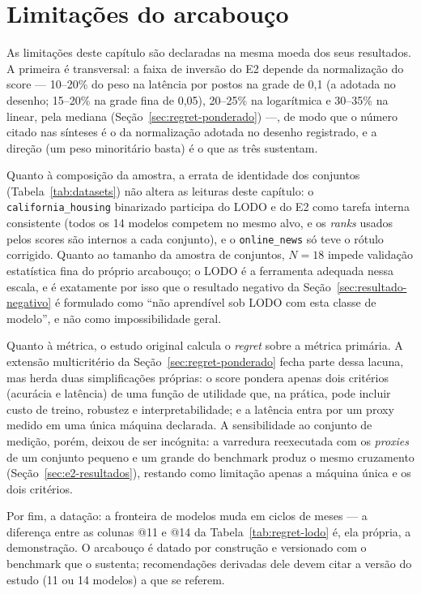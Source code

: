 \section{Limitações do arcabouço}
\label{sec:limitacoes-framework}

As limitações deste capítulo são declaradas na mesma moeda dos seus
resultados. A primeira é transversal: a faixa de inversão do E2
depende da normalização do score --- 10--20\% do peso na latência
por postos na grade de 0,1 (a adotada no desenho; 15--20\% na grade
fina de 0,05), 20--25\% na logarítmica e
30--35\% na linear, pela mediana
(Seção~\ref{sec:regret-ponderado}) ---, de modo que o número citado
nas sínteses é o da normalização adotada no desenho registrado, e a
direção (um
peso minoritário basta) é o que as três sustentam.

Quanto à composição da amostra, a errata de identidade dos conjuntos
(Tabela~\ref{tab:datasets}) não altera as leituras deste capítulo: o
\texttt{california\_\allowbreak housing} binarizado participa do LODO e do E2 como
tarefa interna consistente (todos os 14 modelos competem no mesmo alvo,
e os \emph{ranks} usados pelos scores são internos a cada conjunto), e
o \texttt{online\_news} só teve o rótulo corrigido. Quanto ao tamanho
da amostra de conjuntos, $N{=}18$ impede validação
estatística fina do próprio arcabouço; o LODO é a ferramenta adequada
nessa escala, e é exatamente por isso que o resultado negativo
da Seção~\ref{sec:resultado-negativo} é formulado como ``não aprendível
sob LODO com esta classe de modelo'', e não como impossibilidade geral.

Quanto à métrica, o estudo original calcula o \emph{regret} sobre a
métrica primária. A extensão multicritério da
Seção~\ref{sec:regret-ponderado} fecha parte dessa lacuna, mas herda
duas simplificações próprias: o score pondera apenas dois critérios
(acurácia e latência) de uma função de utilidade que, na prática, pode
incluir custo de treino, robustez e interpretabilidade; e a latência
entra por um proxy medido em uma única máquina declarada. A sensibilidade
ao conjunto de medição, porém, deixou de ser incógnita: a varredura
reexecutada com os \emph{proxies} de um conjunto pequeno e um grande do benchmark
produz o mesmo cruzamento (Seção~\ref{sec:e2-resultados}), restando como
limitação apenas a máquina única e os dois critérios.

Por fim, a datação: a fronteira de modelos muda em ciclos de meses --- a
diferença entre as colunas @11 e @14 da Tabela~\ref{tab:regret-lodo} é,
ela própria, a demonstração. O arcabouço é datado por construção e
versionado com o benchmark que o sustenta; recomendações derivadas dele
devem citar a versão do estudo (11 ou 14 modelos) a que se referem.


